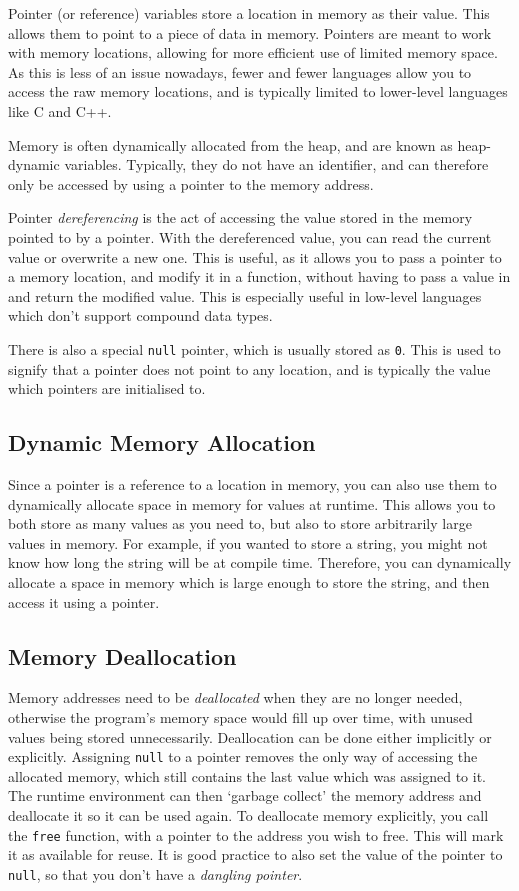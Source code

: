 Pointer (or reference) variables store a location in memory as their value. This allows them to point to a piece of data
 in memory. Pointers are meant to work with memory locations, allowing for more efficient use of limited memory space.
 As this is less of an issue nowadays, fewer and fewer languages allow you to access the raw memory locations, and is
 typically limited to lower-level languages like C and C++.

Memory is often dynamically allocated from the heap, and are known as heap-dynamic variables. Typically, they do not have
 an identifier, and can therefore only be accessed by using a pointer to the memory address.

Pointer \textit{dereferencing} is the act of accessing the value stored in the memory pointed to by a pointer. With the
 dereferenced value, you can read the current value or overwrite a new one. This is useful, as it allows you to pass a
 pointer to a memory location, and modify it in a function, without having to pass a value in and return the modified
 value. This is especially useful in low-level languages which don't support compound data types.

There is also a special \verb`null` pointer, which is usually stored as \verb`0`. This is used to signify that a pointer
 does not point to any location, and is typically the value which pointers are initialised to.

\subsection*{Dynamic Memory Allocation}

Since a pointer is a reference to a location in memory, you can also use them to dynamically allocate space in memory for
 values at runtime. This allows you to both store as many values as you need to, but also to store arbitrarily large
 values in memory. For example, if you wanted to store a string, you might not know how long the string will be at
 compile time. Therefore, you can dynamically allocate a space in memory which is large enough to store the string, and
 then access it using a pointer.

\subsection*{Memory Deallocation}

Memory addresses need to be \textit{deallocated} when they are no longer needed, otherwise the program's memory space
 would fill up over time, with unused values being stored unnecessarily. Deallocation can be done either implicitly or
 explicitly. Assigning \verb`null` to a pointer removes the only way of accessing the allocated memory, which still
 contains the last value which was assigned to it. The runtime environment can then `garbage collect' the memory address
 and deallocate it so it can be used again. To deallocate memory explicitly, you call the \verb`free` function, with a
 pointer to the address you wish to free. This will mark it as available for reuse. It is good practice to also set the
 value of the pointer to \verb`null`, so that you don't have a \textit{dangling pointer}.

